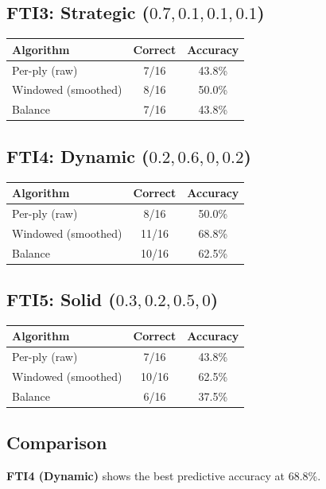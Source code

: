 \documentclass[11pt]{book}
\begin{document}
\subsection{FTI3: Strategic ($0.7, 0.1, 0.1, 0.1$)}

\begin{tabular}{lcc}
\toprule
\textbf{Algorithm} & \textbf{Correct} & \textbf{Accuracy} \\
\midrule
Per-ply (raw) & 7/16 & 43.8\% \\
Windowed (smoothed) & 8/16 & 50.0\% \\
Balance & 7/16 & 43.8\% \\
\bottomrule
\end{tabular}

\subsection{FTI4: Dynamic ($0.2, 0.6, 0, 0.2$)}

\begin{tabular}{lcc}
\toprule
\textbf{Algorithm} & \textbf{Correct} & \textbf{Accuracy} \\
\midrule
Per-ply (raw) & 8/16 & 50.0\% \\
Windowed (smoothed) & 11/16 & 68.8\% \\
Balance & 10/16 & 62.5\% \\
\bottomrule
\end{tabular}

\subsection{FTI5: Solid ($0.3, 0.2, 0.5, 0$)}

\begin{tabular}{lcc}
\toprule
\textbf{Algorithm} & \textbf{Correct} & \textbf{Accuracy} \\
\midrule
Per-ply (raw) & 7/16 & 43.8\% \\
Windowed (smoothed) & 10/16 & 62.5\% \\
Balance & 6/16 & 37.5\% \\
\bottomrule
\end{tabular}

\subsection{Comparison}

\textbf{FTI4 (Dynamic)} shows the best predictive accuracy at 68.8\%.
\end{document}
